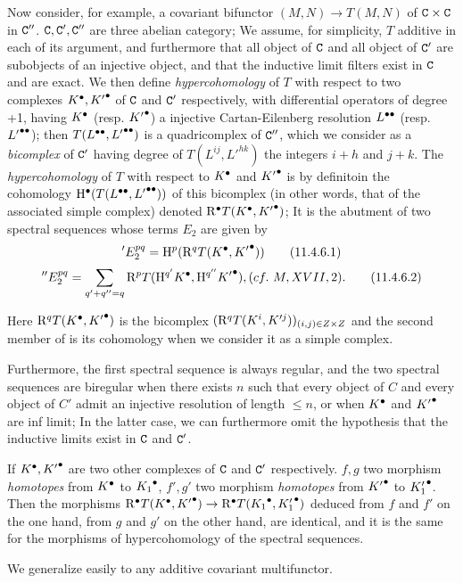 \begin{env}[11.4.6]
\label{0.11.4.6}
Now consider, for example, a covariant bifunctor $(M, N) \rightarrow T(M, N)$ of $\mathtt{C} \times \mathtt{C}$ in $\mathtt{C}''$.
$\mathtt{C}, \mathtt{C}', \mathtt{C}''$ are three abelian category; We assume, for simplicity, $T$ additive in each of its argument, 
and furthermore that all object of $\mathtt{C}$ and all object of $\mathtt{C}'$ are subobjects of an injective object, 
and that the inductive limit filters exist in $\mathtt{C}$ and are exact.
We then define \emph{hypercohomology} of $T$ with respect to two complexes ${K}^{\bullet}, {K'}^{\bullet}$ of $\mathtt{C}$ and $\mathtt{C}'$ respectively, 
with differential operators of degree +1, having ${K}^{\bullet}$ (resp. ${K'}^{\bullet}$) a injective Cartan-Eilenberg resolution ${L}^{\bullet\bullet}$ (resp. ${L'}^{\bullet\bullet}$);
then $T({L}^{\bullet\bullet}, {L'}^{\bullet\bullet})$ is a quadricomplex of $\mathtt{C}''$, which we consider as a \emph{bicomplex} of $\mathtt{C}'$ having degree of $T(L^{ij}, L'^{hk})$ the integers $i+h$ and $j+k$.
The \emph{hypercohomology} of $T$ with respect to ${K}^{\bullet}$ and ${K'}^{\bullet}$ is by definitoin the cohomology ${\mathrm{H}}^{\bullet}(T({L}^{\bullet\bullet}, {L'}^{\bullet\bullet}))$ of this bicomplex 
(in other words, that of the associated simple complex) denoted ${\mathrm{R}}^{\bullet}T({K}^{\bullet}, {K'}^{\bullet})$;
It is the abutment of two spectral sequences whose terms $E_2$ are given by
\[
\label{0.11.4.6.1}
  'E_2^{pq} = \mathrm{H}^p(\mathrm{R}^q T({K}^{\bullet}, {K'}^{\bullet}))
\tag{11.4.6.1}
\]
\[
\label{0.11.4.6.2}
  ''E_2^{pq} = \sum_{q'+q''=q}\mathrm{R}^p T(\mathrm{H}^{q'}{{K}^{\bullet}},\mathrm{H}^{q''}{{K'}^{\bullet}}), (cf.\ M, XVII, 2).
\tag{11.4.6.2}
\]

Here $\mathrm{R}^q T({K}^{\bullet}, {K'}^{\bullet})$ is the bicomplex $(\mathrm{R}^q T(K^i, K'^j))_{(i,j)\in Z\times Z}$ and the second member of  is its cohomology when we consider it as a simple complex.

Furthermore, the first spectral sequence is always regular, and the two spectral sequences are biregular when there exists $n$ such that every object of $C$ and every object of $C'$ 
admit an injective resolution of length $\leq n$, or when ${K}^{\bullet}$ and ${K'}^{\bullet}$ are inf limit;
In the latter case, we can furthermore omit the hypothesis that the inductive limits exist in $\mathtt{C}$ and $\mathtt{C}'$.

If ${K}^{\bullet}, {K'}^{\bullet}$ are two other complexes of $\mathtt{C}$ and $\mathtt{C}'$ respectively.
$f, g$ two morphism \emph{homotopes} from ${K}^{\bullet}$ to ${K_1}^{\bullet}$, 
$f', g'$ two morphism \emph{homotopes} from ${K'}^{\bullet}$ to ${K'_1}^{\bullet}$.
Then the morphisms ${\mathrm{R}}^{\bullet} T({K}^{\bullet}, {K'}^{\bullet}) \rightarrow {\mathrm{R}}^{\bullet} T({K_1}^{\bullet}, {K'_1}^{\bullet})$ 
deduced from $f$ and $f'$ on the one hand, from $g$ and $g'$ on the other hand, are identical, 
and it is the same for the morphisms of hypercohomology of the spectral sequences.

We generalize easily to any additive covariant multifunctor.
\end{env}

